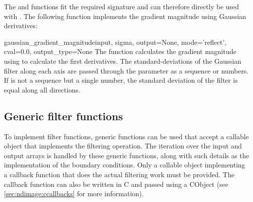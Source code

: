 The  and  functions fit the required
signature and can therefore directly be used with
. The following function implements 
the gradient magnitude using Gaussian derivatives:

\begin{funcdesc}{gaussian_gradient_magnitude}{input, sigma, output=None, 
  mode='reflect', cval=0.0, output_type=None} The function
   calculates the gradient magnitude
  using  to calculate the first derivatives. The
  standard-deviations of the Gaussian filter along each axis are passed 
  through the parameter  as a sequence or numbers.  If 
   is not a sequence but a single number, the standard deviation 
  of the filter is equal along all directions.
\end{funcdesc}

\subsection{Generic filter functions}
\label{sec:ndimage:genericfilters}
To implement filter functions, generic functions can be used that accept a 
callable object that implements the filtering operation. The iteration over 
the input and output arrays is handled by these generic functions, along 
with such details as the implementation of the boundary conditions. Only a 
callable object implementing a callback function that does the actual 
filtering work must be provided. The callback function can also be written 
in C and passed using a CObject (see \ref{sec:ndimage:ccallbacks} for more 
information).

